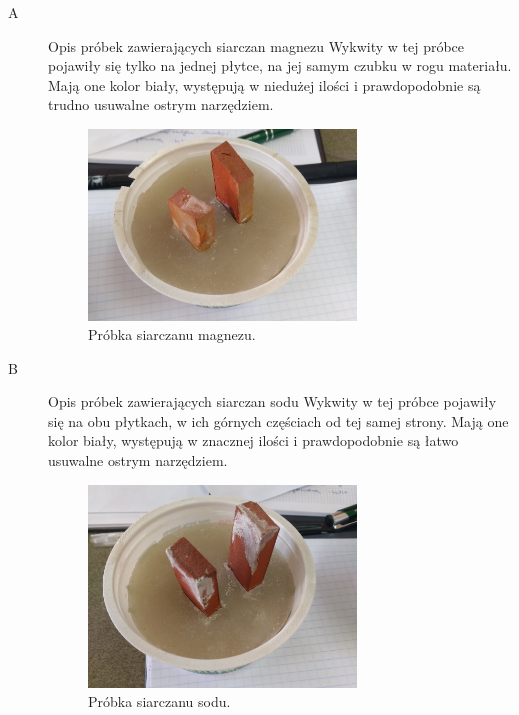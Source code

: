 \begin{description}
    \item[A] Opis próbek zawierających siarczan magnezu
    \newline
    \newline
    Wykwity w tej próbce pojawiły się tylko na jednej płytce, na jej samym czubku w rogu materiału. Mają one kolor biały, występują w niedużej ilości i prawdopodobnie są trudno usuwalne ostrym narzędziem.

    \begin{figure}[H]
        \begin{center}
        \includegraphics[width=0.7\textwidth]{img/siarczan_magnezu.jpg}
        \caption{Próbka siarczanu magnezu.}
        \end{center}
    \end{figure}

    \item[B] Opis próbek zawierających siarczan sodu 
    \newline
    \newline
    Wykwity w tej próbce pojawiły się na obu płytkach, w ich górnych częściach od tej samej strony. Mają one kolor biały, występują w znacznej ilości i prawdopodobnie są łatwo usuwalne ostrym narzędziem.

    \begin{figure}[H]
        \begin{center}
            \includegraphics[width=0.7\textwidth]{img/siarczan_sodu.jpg}
            \caption{Próbka siarczanu sodu.}
        \end{center}
    \end{figure}

\end{description}

